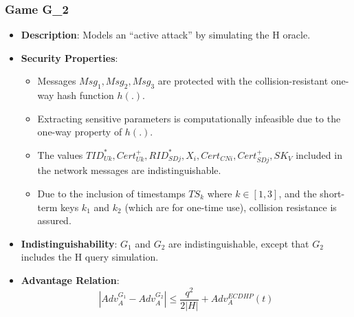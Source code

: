 \documentclass[9pt,handout]{beamer}
\begin{document}
\begin{frame}
    \frametitle{Game G_2}
    \begin{itemize}
        \item \textbf{Description}: Models an “active attack” by simulating the H oracle.
        \item \textbf{Security Properties}:
            \begin{itemize}
                \item Messages \( Msg_1, Msg_2, Msg_3 \) are protected with the collision-resistant one-way hash function \( h(.) \).
                \item Extracting sensitive parameters is computationally infeasible due to the one-way property of \( h(.) \).
                \item The values \( TID^{*}_{Uk}, Cert^{+}_{Uk}, RID^{*}_{SDj}, X_i, Cert_{CNi}, Cert^{+}_{SDj}, SK_{V} \) included in the network messages are indistinguishable.
                \item Due to the inclusion of timestamps \( TS_k \) where \( k \in [1, 3] \), and the short-term keys \( k_1 \) and \( k_2 \) (which are for one-time use), collision resistance is assured.
            \end{itemize}
        \item \textbf{Indistinguishability}: \( G_1 \) and \( G_2 \) are indistinguishable, except that \( G_2 \) includes the H query simulation.
        \item \textbf{Advantage Relation}:
        \[
            |Adv_{A}^{G_1} - Adv_{A}^{G_2}| \leq \frac{q^2}{2|H|} + Adv_{A}^{ECDHP}(t)
        \]
    \end{itemize}
\end{frame}
\end{document}
